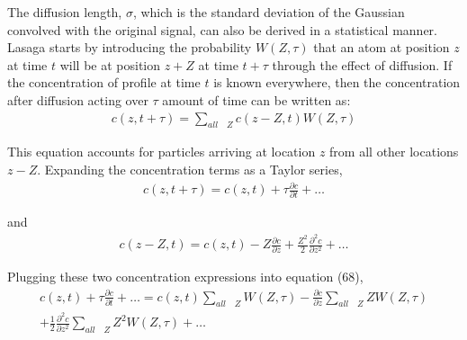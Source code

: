 \documentclass[draft, jgrga]{AGUTeX}
\begin{document}
\begin{article}
The diffusion length, \begin{math} \sigma \end{math}, which is the standard deviation of the Gaussian convolved with the original signal, can also be derived in a statistical manner. Lasaga starts by introducing the probability \begin{math} W(Z,\tau) \end{math} that an atom at position \begin{math} z \end{math} at time \begin{math} t \end{math} will be at position \begin{math} z + Z \end{math} at time \begin{math} t + \tau \end{math} through the effect of diffusion. If the concentration of profile at time \begin{math} t \end{math} is known everywhere, then the concentration after diffusion acting over \begin{math} \tau \end{math} amount of time can be written as:
\begin{eqnarray}
c(z, t + \tau) = \sum_{all \quad Z} c(z - Z, t) W(Z, \tau)
\end{eqnarray}

This equation accounts for particles arriving at location \begin{math} z \end{math} from all other locations \begin{math} z - Z \end{math}. Expanding the concentration terms as a Taylor series,
\begin{eqnarray}
c(z, t + \tau) = c(z,t)+ \tau \frac{\partial c}{\partial t} + \ldots
\end{eqnarray}

and
\begin{eqnarray}
c(z-Z,t) = c(z,t) - Z \frac{\partial c}{\partial z} + \frac{Z^2}{2} \frac{\partial^2 c}{\partial z^2} + \ldots
\end{eqnarray}

Plugging these two concentration expressions into equation (68),
\begin{eqnarray}
c(z,t)+ \tau \frac{\partial c}{\partial t} + \ldots  =
c(z,t) \sum_{all \quad Z} W(Z,\tau) - \frac{\partial c}{\partial z}
\sum_{all \quad Z} ZW(Z, \tau) \\
+ \frac{1}{2} \frac{\partial ^2 c}{\partial z^2}
\sum_{all \quad Z} Z^2 W(Z, \tau) + \ldots \nonumber
\end{eqnarray}


\end{article}
\end{document}
